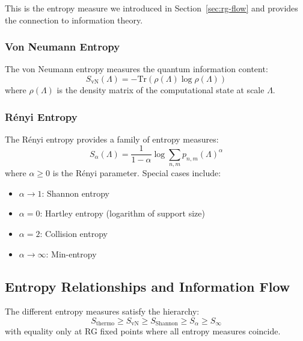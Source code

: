 \begin{theorem}
This is the entropy measure we introduced in Section~\ref{sec:rg-flow} and provides the connection to information theory.

\subsubsection{Von Neumann Entropy}

\begin{definition}
\label{def:von-neumann-entropy}
The von Neumann entropy measures the quantum information content:
\[
S_{\text{vN}}(\Lambda) = -\text{Tr}(\rho(\Lambda) \log \rho(\Lambda))
\]
where $\rho(\Lambda)$ is the density matrix of the computational state at scale $\Lambda$.
\end{definition}

\subsubsection{Rényi Entropy}

\begin{definition}
\label{def:renyi-entropy}
The Rényi entropy provides a family of entropy measures:
\[
S_{\alpha}(\Lambda) = \frac{1}{1-\alpha} \log \sum_{n,m} p_{n,m}(\Lambda)^\alpha
\]
where $\alpha \geq 0$ is the Rényi parameter. Special cases include:
\begin{itemize}
\item $\alpha \to 1$: Shannon entropy
\item $\alpha = 0$: Hartley entropy (logarithm of support size)
\item $\alpha = 2$: Collision entropy
\item $\alpha \to \infty$: Min-entropy
\end{itemize}
\end{definition}

\subsection{Entropy Relationships and Information Flow}

\begin{theorem}
\label{thm:entropy-hierarchy}
The different entropy measures satisfy the hierarchy:
\[
S_{\text{thermo}} \geq S_{\text{vN}} \geq S_{\text{Shannon}} \geq S_{\alpha} \geq S_{\infty}
\]
with equality only at RG fixed points where all entropy measures coincide.
\end{theorem}


\end{theorem}
